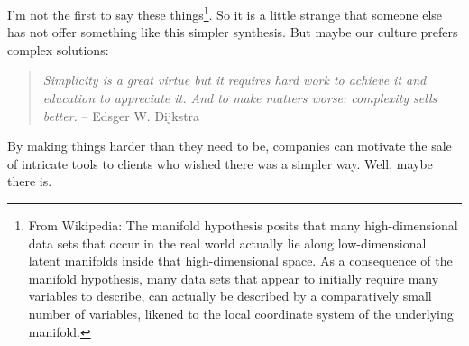 \documentclass[landscape,	DIV=calc,%
							paper=letter,%
							fontsize=10pt,%
							twocolumn]{scrartcl}	 					%
\begin{document}
I'm not the first to say these things\footnote{
From Wikipedia: The manifold hypothesis posits that many
high-dimensional data sets that occur in the real world actually
lie along low-dimensional latent manifolds inside that high-dimensional
space. As a consequence of the manifold hypothesis, many data sets
that appear to initially require many variables to describe, can
actually be described by a comparatively small number of variables,
likened to the local coordinate system of the underlying manifold.}.
So it is a little
strange that someone else has not offer something like this simpler
synthesis. But maybe our culture prefers complex solutions:

\begin{quote}{\em Simplicity is a great virtue but it requires hard work to achieve
it and education to appreciate it. And to make matters worse:
complexity sells better.}\newline
-- Edsger W. Dijkstra
\end{quote}

By making things harder than they need to be, companies can motivate
the sale  of intricate tools to clients who wished there was a
simpler way. Well, maybe there is.




\end{document}
